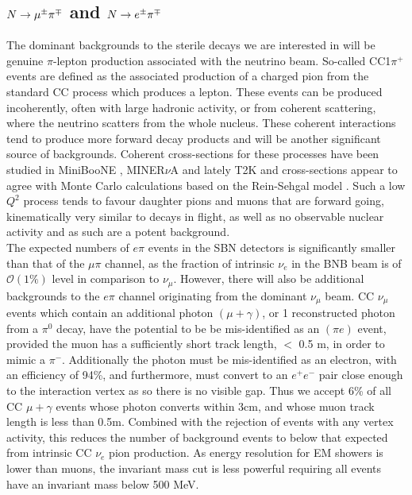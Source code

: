 \documentclass[11pt, a4paper]{article}
\def\minerva{MINER$\nu$A}
\def\ster{\ensuremath N}
\begin{document}
\subsection{$\ster \rightarrow \mu^\pm \pi^\mp$ and $\ster \rightarrow e^\pm \pi^\mp$   }

The dominant backgrounds to the sterile decays we are interested in will be
genuine $\pi$-lepton production associated with the neutrino beam. So-called
CC1$\pi^+$ events are defined as the associated production of a charged pion
from the standard CC process which produces a lepton. These events can be
produced incoherently, often with large hadronic activity, or from coherent
scattering, where the neutrino scatters from the whole nucleus. These coherent
interactions tend to produce more forward decay products and will be another
significant source of backgrounds. Coherent cross-sections for these processes
have been studied in MiniBooNE \cite{Wascko:2006tx}, \minerva
\cite{Eberly:2014mra} and lately T2K and cross-sections appear to agree with
Monte Carlo calculations based on the Rein-Sehgal model \cite{Rein:2006di,
Rein:1982pf}.  Such a low $Q^2$ process tends to favour daughter pions and
muons that are forward going, kinematically very similar to decays in flight,
as well as no observable nuclear activity and as such are a potent
background.\\ 

The expected numbers of $e \pi$ events in the SBN detectors is significantly
smaller than that of the $\mu \pi$ channel, as the fraction of intrinsic
$\nu_e$ in the BNB beam is of $\mathcal{O}(1\%)$ level in comparison to
$\nu_\mu$. However, there will also be additional backgrounds to the $e \pi$
channel originating from the dominant $\nu_\mu$ beam. CC $\nu_\mu$ events which
contain an additional photon $(\mu+\gamma)$, or 1 reconstructed photon from a
$\pi^0$ decay, have the potential to be be mis-identified as an $(\pi e)$
event, provided the muon has a sufficiently short track length, $<$ 0.5 m, in
order to mimic a $\pi^-$. Additionally the photon must be mis-identified as an
electron, with an efficiency of 94\%, and furthermore, must convert to an
$e^+e^-$ pair close enough to the interaction vertex as so there is no visible
gap. Thus we accept 6\% of all CC $\mu+\gamma$ events whose photon converts
within 3cm, and whose muon track length is less than 0.5m. Combined with the
rejection of events with any vertex activity, this reduces the number of
background events to below that expected from intrinsic CC $\nu_e$ pion
production. As energy resolution for EM showers is lower than muons, the
invariant mass cut is less powerful requiring all events have an invariant mass
below 500 MeV. 
\end{document}
